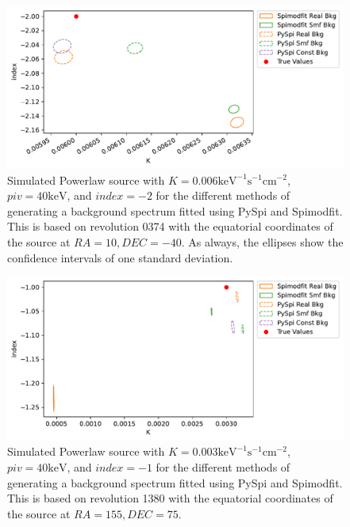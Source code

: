 \documentclass{article}
\begin{document}
\begin{figure}[h]
    \includegraphics[width=\textwidth]{Images/0374_sim_source.pdf}
    \caption{Simulated Powerlaw source with $K=0.006\text{keV}^{-1}\text{s}^{-1}\text{cm}^{-2}$, $piv=40\text{keV}$, and $index=-2$ for the different methods of generating a background spectrum fitted using PySpi and Spimodfit. This is based on revolution 0374 with the equatorial coordinates of the source at $RA=10, DEC=-40$. As always, the ellipses show the confidence intervals of one standard deviation.}
    \label{0374 sim source}
\end{figure}

\begin{figure}[h]
    \includegraphics[width=\textwidth]{Images/1380_sim_source.pdf}
    \caption{Simulated Powerlaw source with $K=0.003\text{keV}^{-1}\text{s}^{-1}\text{cm}^{-2}$, $piv=40\text{keV}$, and $index=-1$ for the different methods of generating a background spectrum fitted using PySpi and Spimodfit. This is based on revolution 1380 with the equatorial coordinates of the source at $RA=155, DEC=75$.}
    \label{1380 sim source}
\end{figure}
\end{document}
